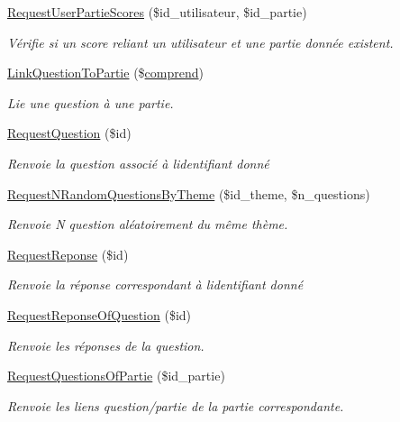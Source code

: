 \begin{DoxyCompactItemize}
\mbox{\hyperlink{class_interface_b_d_d_a71f154f1bff6e6659dddefcde250f993}{Request\+User\+Partie\+Scores}} (\$id\+\_\+utilisateur, \$id\+\_\+partie)
\begin{DoxyCompactList}\small\item\em Vérifie si un score reliant un utilisateur et une partie donnée existent. \end{DoxyCompactList}\item 
\mbox{\hyperlink{class_interface_b_d_d_a230a88f1d16eb95926e03544b4a75279}{Link\+Question\+To\+Partie}} (\$\mbox{\hyperlink{classcomprend}{comprend}})
\begin{DoxyCompactList}\small\item\em Lie une question à une partie. \end{DoxyCompactList}\item 
\mbox{\hyperlink{class_interface_b_d_d_a363d433b9362a9d7e70c3b88f665c6e2}{Request\+Question}} (\$id)
\begin{DoxyCompactList}\small\item\em Renvoie la question associé à l\textquotesingle{}identifiant donné \end{DoxyCompactList}\item 
\mbox{\hyperlink{class_interface_b_d_d_aa55c97f41f0473692fa3c3be52b16d91}{Request\+N\+Random\+Questions\+By\+Theme}} (\$id\+\_\+theme, \$n\+\_\+questions)
\begin{DoxyCompactList}\small\item\em Renvoie N question aléatoirement du même thème. \end{DoxyCompactList}\item 
\mbox{\hyperlink{class_interface_b_d_d_a653d317c29317946ca25680b7ce39c98}{Request\+Reponse}} (\$id)
\begin{DoxyCompactList}\small\item\em Renvoie la réponse correspondant à l\textquotesingle{}identifiant donné \end{DoxyCompactList}\item 
\mbox{\hyperlink{class_interface_b_d_d_aeb7156b09f5a9ee1a472bdaf3ef603b3}{Request\+Reponse\+Of\+Question}} (\$id)
\begin{DoxyCompactList}\small\item\em Renvoie les réponses de la question. \end{DoxyCompactList}\item 
\mbox{\hyperlink{class_interface_b_d_d_aed61db0c78fb2022c40b11e4c7623096}{Request\+Questions\+Of\+Partie}} (\$id\+\_\+partie)
\begin{DoxyCompactList}\small\item\em Renvoie les liens question/partie de la partie correspondante. \end{DoxyCompactList}\item 

\end{DoxyCompactItemize}

